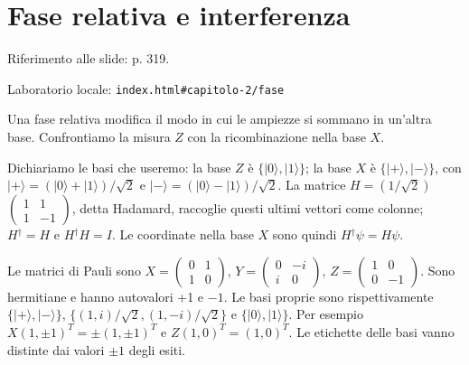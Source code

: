 \Needspace{.43\textheight}
\section{Fase relativa e interferenza}
\label{c2-fase}

{\sffamily\small\color{Ink!70} Riferimento alle slide: p. 319.\par}

{\sffamily\small\color{Ink!70} Laboratorio locale: \nolinkurl{index.html#capitolo-2/fase}\par}

Una fase relativa modifica il modo in cui le ampiezze si sommano in un'altra base. Confrontiamo la misura \(Z\) con la ricombinazione nella base \(X\).\par

Dichiariamo le basi che useremo: la base \(Z\) è \(\{|0\rangle ,\allowbreak |1\rangle \}\); la base \(X\) è \(\{|+\rangle ,\allowbreak |- \rangle \}\), con \(|+\rangle =(|0\rangle +|1\rangle )/\sqrt{2}\) e \(|- \rangle =(|0\rangle - |1\rangle )/\sqrt{2}\). La matrice \(H=(1/\sqrt{2})\)\(\begin{pmatrix}1&1\\1&- 1\end{pmatrix}\), detta Hadamard, raccoglie questi ultimi vettori come colonne; \(H{}^{\dagger} =H\) e \(H{}^{\dagger} H=I\). Le coordinate nella base \(X\) sono quindi \(H{}^{\dagger} \psi =H\psi \).\par

Le matrici di Pauli sono \(X=\)\(\begin{pmatrix}0&1\\1&0\end{pmatrix}\), \(Y=\)\(\begin{pmatrix}0&- i\\i&0\end{pmatrix}\), \(Z=\)\(\begin{pmatrix}1&0\\0&- 1\end{pmatrix}\). Sono hermitiane e hanno autovalori +1 e \(- 1\). Le basi proprie sono rispettivamente \(\{|+\rangle ,\allowbreak |- \rangle \}\), \(\{(1,\allowbreak i)/\sqrt{2},\allowbreak (1,\allowbreak - i)/\sqrt{2}\}\) e \(\{|0\rangle ,\allowbreak |1\rangle \}\). Per esempio \(X(1,\allowbreak \pm 1)^{T}=\pm (1,\allowbreak \pm 1)^{T}\) e \(Z(1{,}0)^{T}=(1{,}0)^{T}\). Le etichette delle basi vanno distinte dai valori \(\pm 1\) degli esiti.\par

